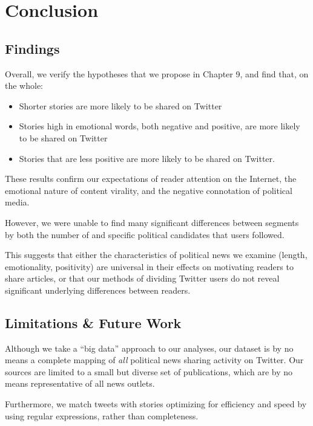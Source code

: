\chapter{Conclusion}

\section{Findings}
 Overall, we verify the hypotheses that we propose in Chapter 9, and find that, on the whole:
\begin{itemize}
    \item Shorter stories are more likely to be shared on Twitter
    \item Stories high in emotional words, both negative and positive, are more likely to be shared on Twitter
    \item Stories that are less positive are more likely to be shared on Twitter.
\end{itemize}

These results confirm our expectations of reader attention on the Internet, the emotional nature of content virality, and the negative connotation of political media. 

However, we were unable to find many significant differences between segments by both the number of and specific political candidates that users followed.

This suggests that either the characteristics of political news we examine (length, emotionality, positivity) are universal in their effects on motivating readers to share articles, or that our methods of dividing Twitter users do not reveal significant underlying differences between readers.


\section{Limitations \& Future Work}
Although we take a ``big data'' approach to our analyses, our dataset is by no means a complete mapping of \emph{all} political news sharing activity on Twitter. Our sources are limited to a small but diverse set of publications, which are by no means representative of all news outlets.

Furthermore, we match tweets with stories optimizing for efficiency and speed by using regular expressions, rather than completeness.

